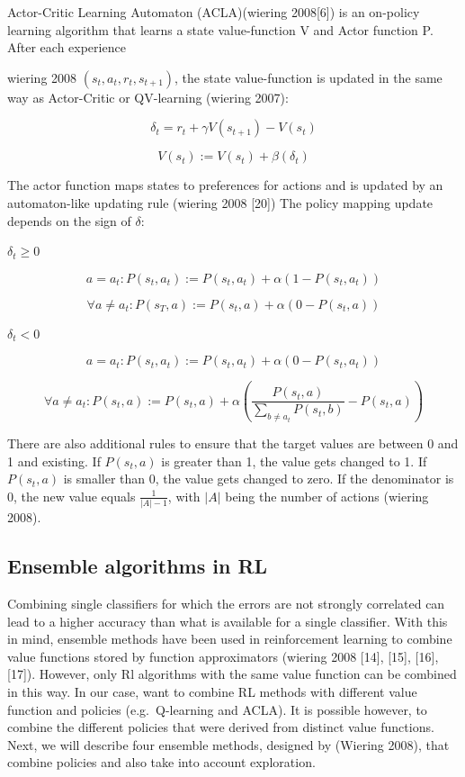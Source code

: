 Actor-Critic Learning Automaton (ACLA)(wiering 2008{[}6{]}) is an
on-policy learning algorithm that learns a state value-function V and
Actor function P. After each experience

wiering 2008 \((s_t, a_t, r_t, s_{t+1})\), the state value-function is
updated in the same way as Actor-Critic or QV-learning (wiering 2007):

\[ \delta_t = r_t + \gamma V(s_{t+1}) - V(s_t) \]

\[ V(s_t) := V(s_t) + \beta ( \delta_t ) \]

The actor function maps states to preferences for actions and is updated
by an automaton-like updating rule (wiering 2008 {[}20{]}) The policy
mapping update depends on the sign of \(\delta\):

\(\delta_t \geq 0\)

\[ a = a_t: P(s_t, a_t) := P(s_t, a_t) + \alpha ( 1 - P(s_t, a_t)) \]

\[ \forall a \neq a_t:  P(s_T, a) := P(s_t, a) + \alpha ( 0 - P(s_t, a))\]

\(\delta_t < 0\)

\[ a = a_t: P(s_t, a_t) := P(s_t, a_t) + \alpha ( 0 - P(s_t, a_t)) \]

\[ \forall a \neq a_t:  P(s_t, a) := P(s_t, a) + \alpha \left( \frac{P(s_t, a)}{\sum_{b \neq a_t}P(s_t, b)} - P(s_t, a) \right)\]

There are also additional rules to ensure that the target values are
between 0 and 1 and existing. If \(P(s_t,a)\) is greater than 1, the
value gets changed to 1. If \(P(s_t,a)\) is smaller than 0, the value
gets changed to zero. If the denominator is 0, the new value equals
\(\frac{1}{|A| -1}\), with \(|A|\) being the number of actions (wiering
2008).

\hypertarget{ensemble-algorithms-in-rl}{%
\subsection{Ensemble algorithms in RL}\label{ensemble-algorithms-in-rl}}

Combining single classifiers for which the errors are not strongly
correlated can lead to a higher accuracy than what is available for a
single classifier. With this in mind, ensemble methods have been used in
reinforcement learning to combine value functions stored by function
approximators (wiering 2008 {[}14{]}, {[}15{]}, {[}16{]}, {[}17{]}).
However, only Rl algorithms with the same value function can be combined
in this way. In our case, want to combine RL methods with different
value function and policies (e.g.~Q-learning and ACLA). It is possible
however, to combine the different policies that were derived from
distinct value functions. Next, we will describe four ensemble methods,
designed by (Wiering 2008), that combine policies and also take into
account exploration.


